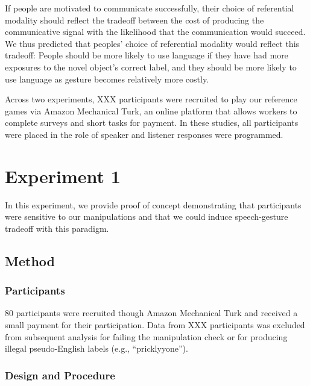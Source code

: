\documentclass[english,,man,floatsintext]{apa6}
\begin{document}
If people are motivated to communicate successfully, their choice of referential modality should reflect the tradeoff between the cost of producing the communicative signal with the likelihood that the communication would succeed. We thus predicted that peoples' choice of referential modality would reflect this tradeoff: People should be more likely to use language if they have had more exposures to the novel object's correct label, and they should be more likely to use language as gesture becomes relatively more costly.

Across two experiments, XXX participants were recruited to play our reference games via Amazon Mechanical Turk, an online platform that allows workers to complete surveys and short tasks for payment. In these studies, all participants were placed in the role of speaker and listener responses were programmed.

\hypertarget{experiment-1}{%
\section{Experiment 1}\label{experiment-1}}

In this experiment, we provide proof of concept demonstrating that participants were sensitive to our manipulations and that we could induce speech-gesture tradeoff with this paradigm.

\hypertarget{method}{%
\subsection{Method}\label{method}}

\hypertarget{participants-1}{%
\subsubsection{Participants}\label{participants-1}}

80 participants were recruited though Amazon Mechanical Turk and received a small payment for their participation. Data from XXX participants was excluded from subsequent analysis for failing the manipulation check or for producing illegal pseudo-English labels (e.g., \enquote{pricklyyone}).

\hypertarget{design-and-procedure}{%
\subsubsection{Design and Procedure}\label{design-and-procedure}}
\end{document}
